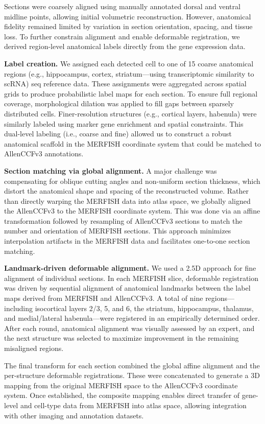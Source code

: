 \documentclass[
  12pt,
]{article}
\begin{document}
Sections were coarsely aligned using manually annotated dorsal and
ventral midline points, allowing initial volumetric reconstruction.
However, anatomical fidelity remained limited by variation in section
orientation, spacing, and tissue loss. To further constrain alignment
and enable deformable registration, we derived region-level anatomical
labels directly from the gene expression data.

\textbf{Label creation.} We assigned each detected cell to one of 15
coarse anatomical regions (e.g., hippocampus, cortex, striatum---using
transcriptomic similarity to scRNA) seq reference data. These
assignments were aggregated across spatial grids to produce
probabilistic label maps for each section. To ensure full regional
coverage, morphological dilation was applied to fill gaps between
sparsely distributed cells. Finer-resolution structures (e.g., cortical
layers, habenula) were similarly labeled using marker gene enrichment
and spatial constraints. This dual-level labeling (i.e., coarse and
fine) allowed us to construct a robust anatomical scaffold in the
MERFISH coordinate system that could be matched to AllenCCFv3
annotations.

\textbf{Section matching via global alignment.} A major challenge was
compensating for oblique cutting angles and non-uniform section
thickness, which distort the anatomical shape and spacing of the
reconstructed volume. Rather than directly warping the MERFISH data into
atlas space, we globally aligned the AllenCCFv3 to the MERFISH
coordinate system. This was done via an affine transformation followed
by resampling of AllenCCFv3 sections to match the number and orientation
of MERFISH sections. This approach minimizes interpolation artifacts in
the MERFISH data and facilitates one-to-one section matching.

\textbf{Landmark-driven deformable alignment.} We used a 2.5D approach
for fine alignment of individual sections. In each MERFISH slice,
deformable registration was driven by sequential alignment of anatomical
landmarks between the label maps derived from MERFISH and AllenCCFv3. A
total of nine regions---including isocortical layers 2/3, 5, and 6, the
striatum, hippocampus, thalamus, and medial/lateral habenula---were
registered in an empirically determined order. After each round,
anatomical alignment was visually assessed by an expert, and the next
structure was selected to maximize improvement in the remaining
misaligned regions.

The final transform for each section combined the global affine
alignment and the per-structure deformable registrations. These were
concatenated to generate a 3D mapping from the original MERFISH space to
the AllenCCFv3 coordinate system. Once established, the composite
mapping enables direct transfer of gene-level and cell-type data from
MERFISH into atlas space, allowing integration with other imaging and
annotation datasets.
\end{document}
